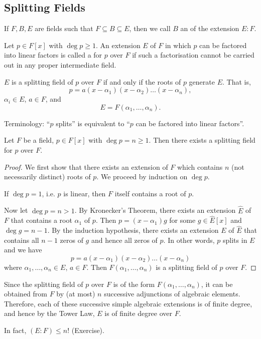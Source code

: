 \subsection{Splitting Fields}
If $F, B, E$ are fields such that $F \subseteq B \subseteq E$, then we call $B$ an  of the extension $E : F$.

\begin{definition}
	Let $p \in F[x]$ with $\deg{p} \geq 1$. An extension $E$ of $F$ in which $p$ can be factored into linear factors is called a  for $p$ over $F$ if such a factorisation cannot be carried out in any proper intermediate field.
\end{definition}

\begin{note}
	$E$ is a splitting field of $p$ over $F$ if and only if the roots of $p$ generate $E$. That is,
	\[
		p = a(x - \alpha_1)(x - \alpha_2)\dots(x - \alpha_n),
	\]
	$\alpha_i \in E$, $a \in F$, and
	\[
		E = F(\alpha_1, \dots, \alpha_n).
	\]
\end{note}

Terminology: ``$p$ splits'' is equivalent to ``$p$ can be factored into linear factors''.

\begin{theorem}\label{thm:9}
	Let $F$ be a field, $p \in F[x]$ with $\deg{p} = n \geq 1$. Then there exists a splitting field for $p$ over $F$.
	\begin{proof}
		We first show that there exists an extension of $F$ which contains $n$ (not necessarily distinct) roots of $p$. We proceed by induction on $\deg{p}$.
		
		If $\deg{p} = 1$, i.e. $p$ is linear, then $F$ itself contains a root of $p$.
		
		Now let $\deg{p} = n > 1$. By Kronecker's Theorem, there exists an extension $\hat{E}$ of $F$ that contains a root $\alpha_1$ of $p$. Then $p = (x - \alpha_1)g$ for some $g \in \hat{E}[x]$ and $\deg{g} = n - 1$. By the induction hypothesis, there exists an extension $E$ of $\hat{E}$ that contains all $n - 1$ zeros of $g$ and hence all zeros of $p$. In other words, $p$ splits in $E$ and we have
		\[
			p = a(x - \alpha_1)(x - \alpha_2)\dots(x - \alpha_n)
		\]
		where $\alpha_1, \dots, \alpha_n \in E$, $a \in F$. Then $F(\alpha_1, \dots, \alpha_n)$ is a splitting field of $p$ over $F$.
	\end{proof}
\end{theorem}

\begin{remark}
	Since the splitting field of $p$ over $F$ is of the form $F(\alpha_1, \dots, \alpha_n)$, it can be obtained from $F$ by (at most) $n$ successive adjunctions of algebraic elements. Therefore, each of these successive simple algebraic extensions is of finite degree, and hence by the Tower Law, $E$ is of finite degree over $F$.
	
	In fact, $(E : F) \leq n!$ (Exercise).
\end{remark}

